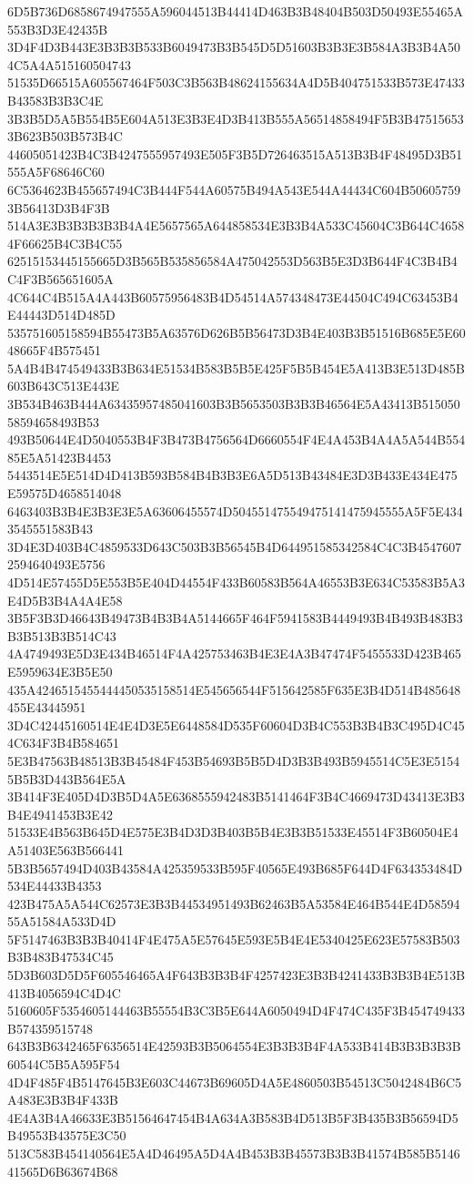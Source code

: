 {{{{{{{{{{{{{{{{{{{{{6D5B736D6858674947555A596044513B44414D463B3B48404B503D50493E55465A553B3D3E42435B
3D4F4D3B443E3B3B3B533B6049473B3B545D5D51603B3B3E3B584A3B3B4A504C5A4A515160504743
51535D66515A605567464F503C3B563B48624155634A4D5B404751533B573E47433B43583B3B3C4E
3B3B5D5A5B554B5E604A513E3B3E4D3B413B555A56514858494F5B3B475156533B623B503B573B4C
44605051423B4C3B4247555957493E505F3B5D726463515A513B3B4F48495D3B51555A5F68646C60
6C5364623B455657494C3B444F544A60575B494A543E544A44434C604B506057593B56413D3B4F3B
514A3E3B3B3B3B3B4A4E5657565A644858534E3B3B4A533C45604C3B644C46584F66625B4C3B4C55
62515153445155665D3B565B535856584A475042553D563B5E3D3B644F4C3B4B4C4F3B565651605A
4C644C4B515A4A443B60575956483B4D54514A574348473E44504C494C63453B4E44443D514D485D
535751605158594B55473B5A63576D626B5B56473D3B4E403B3B51516B685E5E6048665F4B575451
5A4B4B474549433B3B634E51534B583B5B5E425F5B5B454E5A413B3E513D485B603B643C513E443E
3B534B463B444A63435957485041603B3B5653503B3B3B46564E5A43413B51505058594658493B53
493B50644E4D5040553B4F3B473B4756564D6660554F4E4A453B4A4A5A544B55485E5A51423B4453
5443514E5E514D4D413B593B584B4B3B3E6A5D513B43484E3D3B433E434E475E59575D4658514048
6463403B3B4E3B3E3E5A63606455574D504551475549475141475945555A5F5E4343545551583B43
3D4E3D403B4C4859533D643C503B3B56545B4D644951585342584C4C3B45476072594640493E5756
4D514E57455D5E553B5E404D44554F433B60583B564A46553B3E634C53583B5A3E4D5B3B4A4A4E58
3B5F3B3D46643B49473B4B3B4A5144665F464F5941583B4449493B4B493B483B3B3B513B3B514C43
4A4749493E5D3E434B46514F4A425753463B4E3E4A3B47474F5455533D423B465E5959634E3B5E50
435A4246515455444450535158514E545656544F515642585F635E3B4D514B485648455E43445951
3D4C42445160514E4E4D3E5E6448584D535F60604D3B4C553B3B4B3C495D4C454C634F3B4B584651
5E3B47563B48513B3B45484F453B54693B5B5D4D3B3B493B5945514C5E3E51545B5B3D443B564E5A
3B414F3E405D4D3B5D4A5E6368555942483B5141464F3B4C4669473D43413E3B3B4E4941453B3E42
51533E4B563B645D4E575E3B4D3D3B403B5B4E3B3B51533E45514F3B60504E4A51403E563B566441
5B3B5657494D403B43584A425359533B595F40565E493B685F644D4F634353484D534E44433B4353
423B475A5A544C62573E3B3B44534951493B62463B5A53584E464B544E4D5859455A51584A533D4D
5F5147463B3B3B40414F4E475A5E57645E593E5B4E4E5340425E623E57583B503B3B483B47534C45
5D3B603D5D5F605546465A4F643B3B3B4F4257423E3B3B4241433B3B3B4E513B413B4056594C4D4C
5160605F5354605144463B55554B3C3B5E644A6050494D4F474C435F3B454749433B574359515748
643B3B6342465F6356514E42593B3B5064554E3B3B3B4F4A533B414B3B3B3B3B60544C5B5A595F54
4D4F485F4B5147645B3E603C44673B69605D4A5E4860503B54513C5042484B6C5A483E3B3B4F433B
4E4A3B4A46633E3B51564647454B4A634A3B583B4D513B5F3B435B3B56594D5B49553B43575E3C50
513C583B454140564E5A4D46495A5D4A4B453B3B45573B3B3B41574B585B514641565D6B63674B68
}}}}}}}}}}}}}}}}}}}}}
